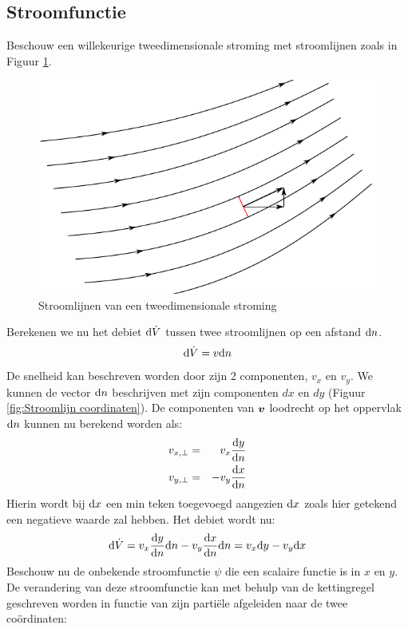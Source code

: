 		\subsection{Stroomfunctie}
Beschouw een willekeurige tweedimensionale stroming met stroomlijnen zoals in Figuur \ref{fig:Stroomfunctie}.
\begin{figure}[htb]
	\centering
	\includegraphics{fig/uitwendige_stroming/Stroomfunctie}
	\caption{Stroomlijnen van een tweedimensionale stroming}
	\label{fig:Stroomfunctie}
\end{figure}
Berekenen we nu het debiet $\mathrm{d} \dot{V}$ tussen twee stroomlijnen op een afstand $\mathrm{d} n$.
\begin{equation}
	\mathrm{d} \dot{V} = v \mathrm{d} n
\end{equation}
De snelheid kan beschreven worden door zijn 2 componenten, $v_x$ en $v_y$. We kunnen de vector $\mathrm{d} n$ beschrijven met zijn componenten $dx$ en $dy$ (Figuur \ref{fig:Stroomlijn coordinaten}). De componenten van $\boldsymbol{v}$ loodrecht op het oppervlak $\mathrm{d} n$ kunnen nu berekend worden als:
\begin{eqnarray}
	v_{x,\perp} &=&  v_x \frac{\mathrm{d} y}{\mathrm{d} n} \\
	v_{y,\perp} &=& -v_y \frac{\mathrm{d} x}{\mathrm{d} n}
\end{eqnarray}
Hierin wordt bij $\mathrm{d} x$ een min teken toegevoegd aangezien $\mathrm{d} x$ zoals hier getekend een negatieve waarde zal hebben. Het debiet wordt nu:
\begin{equation}
	\mathrm{d} \dot{V} = v_x \frac{\mathrm{d} y}{\mathrm{d} n} \mathrm{d} n - v_y \frac{\mathrm{d} x}{\mathrm{d} n} \mathrm{d} n = v_x \mathrm{d} y - v_y \mathrm{d} x
	\label{eqn:debiet tussen stroomlijnen}
\end{equation}
Beschouw nu de onbekende stroomfunctie $\psi$ die een scalaire functie is in $x$ en $y$. De verandering van deze stroomfunctie kan met behulp van de kettingregel geschreven worden in functie van zijn partiële afgeleiden naar de twee co\"ordinaten:
